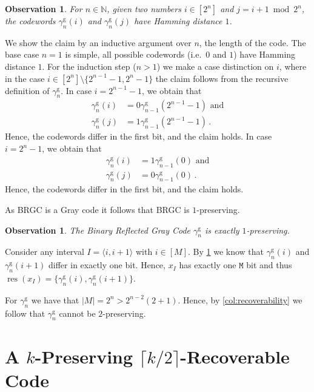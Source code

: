 \documentclass[9pt,journal,compsoc]{IEEEtran}
\newtheorem{observation}[theorem]{Observation}
\theoremstyle{remark}
\DeclareMathOperator{\res}{res}
\newcommand{\mfu}{\mathtt{M}}
\newcommand{\IN}{\mathbb{N}}
\newcommand{\ceil}[1]{\lceil{#1}\rceil}
\newcommand{\ang}[1]{\langle{#1}\rangle}
\newcommand{\intvl}[1]{\ang{#1}}
\newcommand{\gBRGC}[1]{\gamma_{#1}^{\operatorname{g}}}
\begin{document}
\begin{observation}\label{obs:gray_code}
  For $n\in\IN$, given two numbers $i\in[2^n]$ and $j=i+1\bmod2^n$,
  the codewords $\gBRGC{n}(i)$ and $\gBRGC{n}(j)$ have Hamming distance $1$.
\end{observation}
\begin{IEEEproof}
  We show the claim by an inductive argument over $n$, the length of the code.
  The base case $n=1$ is simple, all possible codewords (i.e.\ $0$ and $1$)
  have Hamming distance $1$.
  For the induction step ($n>1$) we make a case distinction on $i$, where
  in the case $i\in[2^n]\setminus\{2^{n-1}-1,2^n-1\}$ the claim follows from the
  recursive definition of $\gBRGC{n}$.
  In case $i=2^{n-1}-1$, we obtain that
  \begin{align*}
    \gBRGC{n}(i)&=0 \gBRGC{n-1}(2^{n-1}-1)\text{ and}\\
    \gBRGC{n}(j)&=1 \gBRGC{n-1}(2^{n-1}-1)\,.
  \end{align*}
  Hence, the codewords differ in the first bit, and the claim holds.
  In case $i=2^n-1$, we obtain that
  \begin{align*}
    \gBRGC{n}(i)&=1 \gBRGC{n-1}(0)\text{ and}\\
    \gBRGC{n}(j)&=0 \gBRGC{n-1}(0)\,.
  \end{align*}
  Hence, the codewords differ in the first bit, and the claim holds.
\end{IEEEproof}

As BRGC is a Gray code it follows that BRGC is $1$-preserving.

\begin{observation}\label{obs:brgc_preserve}
  The Binary Reflected Gray Code $\gBRGC{n}$ is exactly $1$-preserving.
\end{observation}
\begin{IEEEproof}
  Consider any interval $I=\intvl{i,i+1}$ with $i\in[M]$.
  By \cref{obs:gray_code} we know that $\gBRGC{n}(i)$ and $\gBRGC{n}(i+1)$
  differ in exactly one bit. Hence, $x_I$ has exactly one $\mfu$ bit and
  thus $\res(x_I)=\{\gBRGC{n}(i),\gBRGC{n}(i+1)\}$.

  For $\gBRGC{n}$ we have that $|M|=2^n>2^{n-2}(2+1)$.
  Hence, by \cref{col:recoverability} we follow that $\gBRGC{n}$ cannot be $2$-preserving.
\end{IEEEproof}


\section{A \texorpdfstring{$k$}{k}-Preserving \texorpdfstring{$\ceil{k/2}$}{ceil(k/2)}-Recoverable Code}\label{sec:hybcode}
\end{document}
